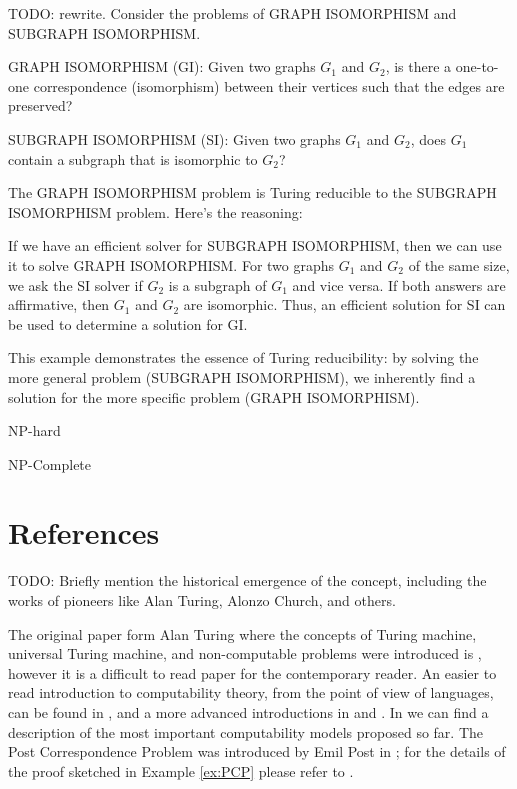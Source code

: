 \begin{example}
{\color{red} TODO: rewrite.}
Consider the problems of GRAPH ISOMORPHISM and SUBGRAPH ISOMORPHISM.

GRAPH ISOMORPHISM (GI): Given two graphs \(G_1\) and \(G_2\), is there a one-to-one correspondence (isomorphism) between their vertices such that the edges are preserved?

SUBGRAPH ISOMORPHISM (SI): Given two graphs \(G_1\) and \(G_2\), does \(G_1\) contain a subgraph that is isomorphic to \(G_2\)?

The GRAPH ISOMORPHISM problem is Turing reducible to the SUBGRAPH ISOMORPHISM problem. Here's the reasoning:

If we have an efficient solver for SUBGRAPH ISOMORPHISM, then we can use it to solve GRAPH ISOMORPHISM. For two graphs \(G_1\) and \(G_2\) of the same size, we ask the SI solver if \(G_2\) is a subgraph of \(G_1\) and vice versa. If both answers are affirmative, then \(G_1\) and \(G_2\) are isomorphic. Thus, an efficient solution for SI can be used to determine a solution for GI.

This example demonstrates the essence of Turing reducibility: by solving the more general problem (SUBGRAPH ISOMORPHISM), we inherently find a solution for the more specific problem (GRAPH ISOMORPHISM).
\end{example}

{\color{red} NP-hard}

{\color{red} NP-Complete}

%
%

\section*{References}

{\color{red} TODO:  Briefly mention the historical emergence of the concept, including the works of pioneers like Alan Turing, Alonzo Church, and others.}

The original paper form Alan Turing where the concepts of Turing machine, universal Turing machine, and non-computable problems were introduced is \cite{turing1936computable}, however it is a difficult to read paper for the contemporary reader. An easier to read introduction to computability theory, from the point of view of languages, can be found in \cite{sipser2012introduction}, and a more advanced introductions in \cite{cooper2003computability} and \cite{soare2016turing}. In \cite{fernandez2009models} we can find a description of the most important computability models proposed so far. The Post Correspondence Problem was introduced by Emil Post in \cite{post1946variant}; for the details of the proof sketched in Example \ref{ex:PCP} please refer to \cite{sipser2012introduction}.

